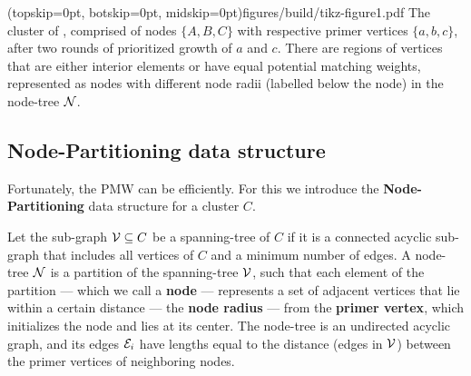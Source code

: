 \Figure[htb](topskip=0pt, botskip=0pt, midskip=0pt){figures/build/tikz-figure1.pdf}{
    The cluster of , comprised of nodes $\{A, B, C\}$ with respective primer vertices $\{a, b, c\}$, after two rounds of prioritized growth of $a$ and $c$. There are regions of vertices that are either interior elements or have equal potential matching weights, represented as nodes with different node radii (labelled below the node) in the node-tree $\mathcal{N}$. \label{fig1}}

\subsection{Node-Partitioning data structure}\label{sec:nodeset}
Fortunately, the PMW can be  efficiently. For this we introduce the \textbf{Node-Partitioning} data structure for a cluster $C$.

Let the sub-graph $\mathcal{V}\subseteq C$ be a spanning-tree of $C$ if it is a connected acyclic sub-graph that includes all vertices of $C$ and a minimum number of edges. A node-tree $\mathcal{N}$ is a partition of the spanning-tree $\mathcal{V}$, such that each element of the partition --- which we call a \textbf{node} --- represents a set of adjacent vertices that lie within a certain distance --- the \textbf{node radius} --- from the \textbf{primer vertex}, which initializes the node and lies at its center. The node-tree is an undirected acyclic graph, and its edges $\mathcal{E}_i$ have lengths equal to the distance (edges in $\mathcal{V}$) between the primer vertices of neighboring nodes. 





